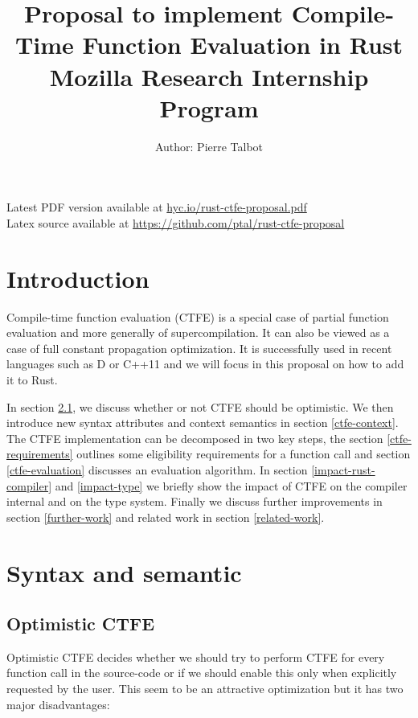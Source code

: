 \documentclass[a4paper,11pt]{article}
\title{Proposal to implement Compile-Time Function Evaluation in Rust\\
\vspace{1em}
\large{Mozilla Research Internship Program}
}
\author{Author: Pierre Talbot}
\begin{document}
\maketitle
\begin{center}
Latest PDF version available at \url{hyc.io/rust-ctfe-proposal.pdf}\\
Latex source available at \url{https://github.com/ptal/rust-ctfe-proposal}
\end{center}
\abstract{}

\tableofcontents
\newpage
\section{Introduction}

Compile-time function evaluation (CTFE) is a special case of partial function evaluation\cite{PE} and more generally of supercompilation\cite{Turchin86theconcept}. It can also be viewed as a case of full constant propagation optimization. It is successfully used in recent languages such as D\cite{D_CTFE} or C++11\cite{DosReis:2010:GCE:1774088.1774537} and we will focus in this proposal on how to add it to Rust.

In section \ref{optimistic-ctfe}, we discuss whether or not CTFE should be optimistic. We then introduce new syntax attributes and context semantics in section \ref{ctfe-context}. The CTFE implementation can be decomposed in two key steps, the section \ref{ctfe-requirements} outlines some eligibility requirements for a function call and section \ref{ctfe-evaluation} discusses an evaluation algorithm. In section \ref{impact-rust-compiler} and \ref{impact-type} we briefly show the impact of CTFE on the compiler internal and on the type system. Finally we discuss further improvements in section \ref{further-work} and related work in section \ref{related-work}.

\section{Syntax and semantic}

\subsection{Optimistic CTFE}
\label{optimistic-ctfe}

Optimistic CTFE decides whether we should try to perform CTFE for every function call in the source-code or if we should enable this only when explicitly requested by the user. This seem to be an attractive optimization but it has two major disadvantages:
\end{document}
